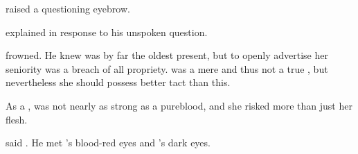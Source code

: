 \Teshrial raised a questioning eyebrow. 

 \Achsah explained in response to his unspoken question.

\Teshrial frowned. 
He knew \Achsah was by far the oldest \resphan present, but to openly advertise her seniority was a breach of all propriety. 
\Achsah was a mere \bezed and thus not a true \CiriathSepher, but nevertheless she should possess better tact than this. 

As a \bezed, \Achsah was not nearly as strong as a pureblood, and she risked more than just her flesh. 

 said \Teshrial.
He met \Ganethed's blood-red eyes and \Achsah's dark eyes.



